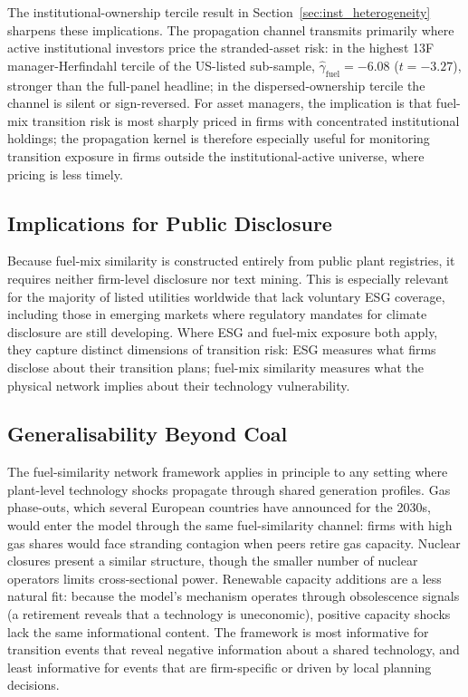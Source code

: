\documentclass[12pt,a4paper]{article}
\begin{document}
The institutional-ownership tercile result in Section~\ref{sec:inst_heterogeneity} sharpens these implications. The propagation channel transmits primarily where active institutional investors price the stranded-asset risk: in the highest 13F manager-Herfindahl tercile of the US-listed sub-sample, $\hat\gamma_{\text{fuel}} = -6.08$ ($t = -3.27$), stronger than the full-panel headline; in the dispersed-ownership tercile the channel is silent or sign-reversed. For asset managers, the implication is that fuel-mix transition risk is most sharply priced in firms with concentrated institutional holdings; the propagation kernel is therefore especially useful for monitoring transition exposure in firms outside the institutional-active universe, where pricing is less timely.

\subsection{Implications for Public Disclosure}\label{sec:disclosure}

Because fuel-mix similarity is constructed entirely from public plant registries, it requires neither firm-level disclosure nor text mining. This is especially relevant for the majority of listed utilities worldwide that lack voluntary ESG coverage, including those in emerging markets where regulatory mandates for climate disclosure are still developing. Where ESG and fuel-mix exposure both apply, they capture distinct dimensions of transition risk: ESG measures what firms disclose about their transition plans; fuel-mix similarity measures what the physical network implies about their technology vulnerability.

\subsection{Generalisability Beyond Coal}\label{sec:generalisability}

The fuel-similarity network framework applies in principle to any setting where plant-level technology shocks propagate through shared generation profiles. Gas phase-outs, which several European countries have announced for the 2030s, would enter the model through the same fuel-similarity channel: firms with high gas shares would face stranding contagion when peers retire gas capacity. Nuclear closures present a similar structure, though the smaller number of nuclear operators limits cross-sectional power. Renewable capacity additions are a less natural fit: because the model's mechanism operates through obsolescence signals (a retirement reveals that a technology is uneconomic), positive capacity shocks lack the same informational content. The framework is most informative for transition events that reveal negative information about a shared technology, and least informative for events that are firm-specific or driven by local planning decisions.
\end{document}
